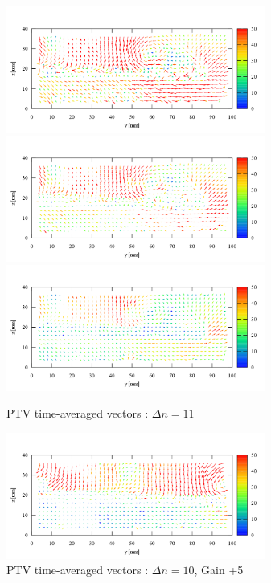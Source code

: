 \documentclass[twocolumn,a4j]{jsarticle}
\begin{document}
\begin{figure}[htbp]
  \footnotesize
  \begin{center}
    \includegraphics[width=85mm]{../images/right_+0.png}
    \includegraphics[width=85mm]{../images/right_+5.png}
    \includegraphics[width=85mm]{../images/right_+10.png}
  \end{center}
  \caption{PTV time-averaged vectors : $\Delta n = 11$}
\end{figure}

\begin{figure}[htbp]
  \footnotesize
  \begin{center}
    \includegraphics[width=85mm]{../images/center_+5.png}
  \end{center}
  \caption{PTV time-averaged vectors : $\Delta n = 10$, Gain +5}
\end{figure}
\end{document}
